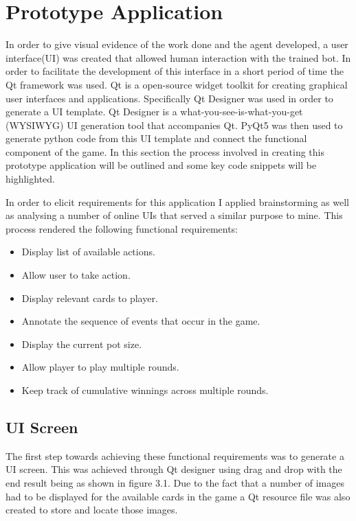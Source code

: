 \section{Prototype Application}\label{sec:prototypeApp}
In order to give visual evidence of the work done and the agent developed, a user interface(UI) was created
that allowed human interaction with the trained bot.
In order to facilitate the development of this interface in a short period of time the Qt framework was used.
Qt is a open-source widget toolkit for creating graphical user interfaces and applications.
Specifically Qt Designer was used in order to generate a UI template.
Qt Designer is a what-you-see-is-what-you-get (WYSIWYG) UI generation tool that accompanies Qt.
PyQt5 was then used to generate python code from this UI template and connect the functional component of the game.
In this section the process involved in creating this prototype application will be outlined
and some key code snippets will be highlighted.

In order to elicit requirements for this application I applied brainstorming as well as analysing a number
of online UIs that served a similar purpose to mine.
This process rendered the following functional requirements:
\begin{itemize}
    \item Display list of available actions.
    \item Allow user to take action.
    \item Display relevant cards to player.
    \item Annotate the sequence of events that occur in the game.
    \item Display the current pot size.
    \item Allow player to play multiple rounds.
    \item Keep track of cumulative winnings across multiple rounds.
\end{itemize}

\subsection{UI Screen}\label{subsec:UiScreen}
The first step towards achieving these functional requirements was to generate a UI screen.
This was achieved through Qt designer using drag and drop with the end result being as shown in figure 3.1.
Due to the fact that a number of images had to be displayed for the available cards in the
game a Qt resource file was also created to store and locate those images.

